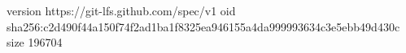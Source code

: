 version https://git-lfs.github.com/spec/v1
oid sha256:c2d490f44a150f74f2ad1ba1f8325ea946155a4da999993634c3e5ebb49d430c
size 196704
